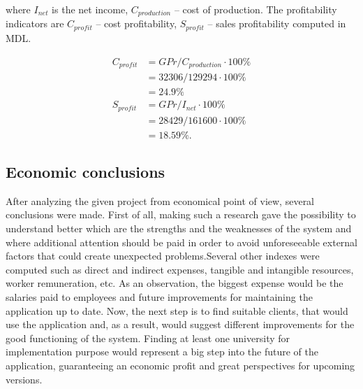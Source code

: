 \noindent
where $I_{net}$ is the net income, $C_{production}$ -- cost of production. The profitability indicators are $C_{profit}$ -- cost profitability, $S_{profit}$ -- sales profitability computed in MDL.

\begin{equation}
 \begin{split}
  C_{profit} &= GPr / C_{production} \cdot 100\%\\
              &= 32306 / 129294 \cdot 100\% \\
              &= 24.9 \%\\
  S_{profit} &= GPr / I_{net} \cdot 100\% \\
             &= 28429 / 161600 \cdot 100\% \\
             &= 18.59 \%.
 \end{split}
\end{equation}

\subsection{Economic conclusions}
After analyzing the given project from economical point of view, several conclusions were made. First of all, making such a research gave the possibility to understand better which are the strengths  and the weaknesses of the system and where additional attention should be paid in order to avoid unforeseeable external factors that could create unexpected problems.Several other indexes were computed such as direct and indirect expenses, tangible and intangible resources, worker remuneration, etc. As an observation, the biggest expense would be the salaries paid to employees and future improvements for maintaining the application up to date. Now, the next step is to find suitable clients, that would use the application  and, as a result, would suggest different improvements for the good functioning of the system. Finding at least one university for implementation purpose would represent a big step into the future of the application, guaranteeing an economic profit and great perspectives for upcoming versions.
\clearpage